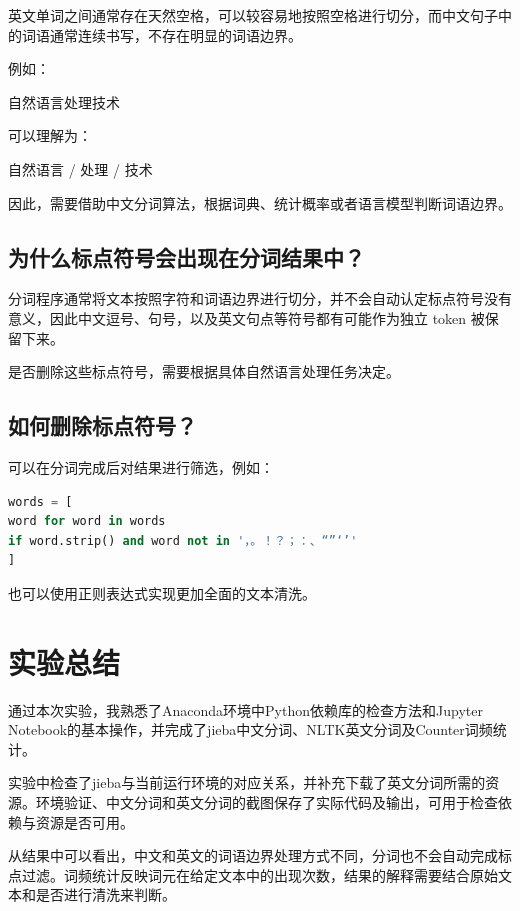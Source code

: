 \documentclass[fontset=none,zihao=-4,a4paper]{ctexart}
\begin{document}
	英文单词之间通常存在天然空格，可以较容易地按照空格进行切分，而中文句子中的词语通常连续书写，不存在明显的词语边界。
	
	例如：
	
	\par\noindent 自然语言处理技术\par
	
	可以理解为：
	
	\par\noindent 自然语言 / 处理 / 技术\par
	
	因此，需要借助中文分词算法，根据词典、统计概率或者语言模型判断词语边界。
	
	\subsection{为什么标点符号会出现在分词结果中？}
	
	分词程序通常将文本按照字符和词语边界进行切分，并不会自动认定标点符号没有意义，因此中文逗号、句号，以及英文句点等符号都有可能作为独立 token 被保留下来。
	
	是否删除这些标点符号，需要根据具体自然语言处理任务决定。
	
	\subsection{如何删除标点符号？}
	
	可以在分词完成后对结果进行筛选，例如：
	
	\par\noindent\begin{minipage}[t]{\linewidth}
\begin{lstlisting}[language=Python]
words = [
word for word in words
if word.strip() and word not in '，。！？；：、“”‘’'
]
	\end{lstlisting}
\end{minipage}\par
	
	也可以使用正则表达式实现更加全面的文本清洗。
	
	\section{实验总结}
通过本次实验，我熟悉了Anaconda环境中Python依赖库的检查方法和Jupyter Notebook的基本操作，并完成了jieba中文分词、NLTK英文分词及Counter词频统计。

实验中检查了jieba与当前运行环境的对应关系，并补充下载了英文分词所需的资源。环境验证、中文分词和英文分词的截图保存了实际代码及输出，可用于检查依赖与资源是否可用。

从结果中可以看出，中文和英文的词语边界处理方式不同，分词也不会自动完成标点过滤。词频统计反映词元在给定文本中的出现次数，结果的解释需要结合原始文本和是否进行清洗来判断。
\end{document}

